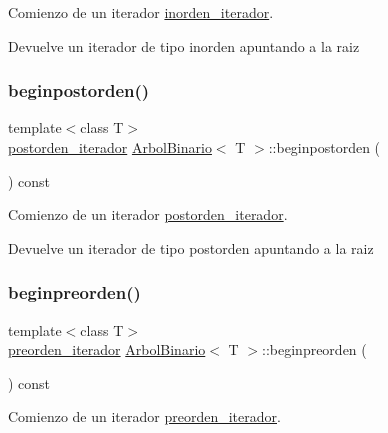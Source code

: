 Comienzo de un iterador \hyperlink{classArbolBinario_1_1inorden__iterador}{inorden\+\_\+iterador}. 

\begin{DoxyReturn}{Devuelve}
un iterador de tipo inorden apuntando a la raiz 
\end{DoxyReturn}
\mbox{\label{classArbolBinario_a1bcccd1312f5127ad811c90dad94931d}} 
\subsubsection{\texorpdfstring{beginpostorden()}{beginpostorden()}}
{\footnotesize\ttfamily template$<$class T$>$ \\
\hyperlink{classArbolBinario_1_1postorden__iterador}{postorden\+\_\+iterador} \hyperlink{classArbolBinario}{Arbol\+Binario}$<$ T $>$\+::beginpostorden (\begin{DoxyParamCaption}{ }\end{DoxyParamCaption}) const}



Comienzo de un iterador \hyperlink{classArbolBinario_1_1postorden__iterador}{postorden\+\_\+iterador}. 

\begin{DoxyReturn}{Devuelve}
un iterador de tipo postorden apuntando a la raiz 
\end{DoxyReturn}
\mbox{\label{classArbolBinario_aa0fc3ba9f91f7167d1f83df2f3b1a8b9}} 
\subsubsection{\texorpdfstring{beginpreorden()}{beginpreorden()}}
{\footnotesize\ttfamily template$<$class T$>$ \\
\hyperlink{classArbolBinario_1_1preorden__iterador}{preorden\+\_\+iterador} \hyperlink{classArbolBinario}{Arbol\+Binario}$<$ T $>$\+::beginpreorden (\begin{DoxyParamCaption}{ }\end{DoxyParamCaption}) const}



Comienzo de un iterador \hyperlink{classArbolBinario_1_1preorden__iterador}{preorden\+\_\+iterador}. 

